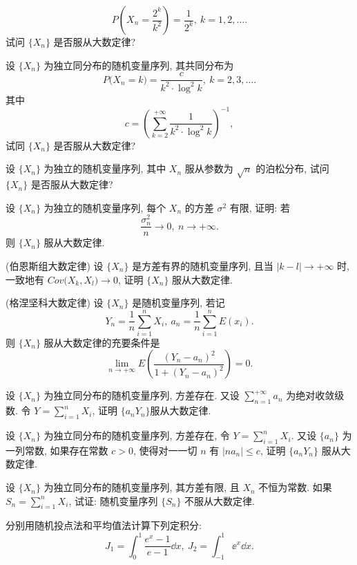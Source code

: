\begin{xiti}
\begin{equation*}
        P \left( X_n = \frac{2^k}{k^2} \right) = \frac{1}{2^k}, \ k = 1, 2, \dotsc .
    \end{equation*}
    试问 $ \{ X_n \} $ 是否服从大数定律?
    \item 设 $ \{ X_n \} $ 为独立同分布的随机变量序列, 其共同分布为
    \begin{equation*}
        P \bigl( X_n = k \bigr) = \frac{c}{k^2 \cdot \log^2 k}, \ k = 2, 3, \dotsc .
    \end{equation*}
    其中
    \begin{equation*}
        c = \left( \sum_{k = 2}^{+\infty} \frac{1}{k^2 \cdot \log^2 k} \right)^{-1},
    \end{equation*}
    试同 $ \{ X_n \} $ 是否服从大数定律?
    \item 设 $ \{ X_n \} $ 为独立的随机变量序列, 其中 $ X_n $ 服从参数为 $ \sqrt{n} $ 的泊松分布, 试问 $ \{ X_n \} $ 是否服从大数定律?
    \item 设 $ \{ X_n \} $ 为独立的随机变量序列, 每个 $ X_n $ 的方差 $ \sigma^2 $ 有限, 证明: 若
    \begin{equation*}
        \frac{\sigma_n^2}{n} \to 0, \ n \to +\infty.
    \end{equation*}
    则 $ \{ X_n \} $ 服从大数定律.
    \item (伯恩斯组大数定律) 设 $ \{ X_n \} $ 是方差有界的随机变量序列, 且当 $ \lvert k - l \rvert \to +\infty $ 时, 一致地有 $ Cov \bigl( X_k, X_l \bigr) \to 0 $, 证明 $ \{ X_n \} $ 服从大数定律.
    \item (格涅坚科大数定律) 设 $ \{ X_n \} $ 是随机变量序列, 若记
    \begin{equation*}
        Y_n = \frac{1}{n} \sum_{i=1}^n X_i, \ a_n = \frac{1}{n} \sum_{i=1}^n E (x_i).
    \end{equation*}
    则 $ \{ X_n \} $ 服从大数定律的充要条件是
    \begin{equation*}
        \lim_{n \to +\infty} E \left( \frac{( Y_n - a_n )^2}{1 + ( Y_n - a_n )^2} \right) = 0.
    \end{equation*}
    \item 设 $ \{ X_n \} $ 为独立同分布的随机变量序列, 方差存在.
    又设 $ \sum_{n=1}^{+\infty} a_n $ 为绝对收敛级数.
    令 $ Y = \sum_{i=1}^n X_i $, 证明 $ \{ a_n Y_n \} $服从大数定律.
    \item 设 $ \{ X_n \} $ 为独立同分布的随机变量序列, 方差存在, 令 $ Y = \sum_{i=1}^n X_i $. 又设 $ \{ a_n \} $ 为一列常数, 如果存在常数 $ c > 0 $, 使得对一一切 $ n $ 有 $ \lvert n a_n \rvert \leq c $, 证明 $ \{ a_n Y_n \} $ 服从大数定律.
    \item 设 $ \{ X_n \} $ 为独立同分布的随机变量序列, 其方差有限, 且 $ X_n $ 不恒为常数.
    如果 $ S_n = \sum_{i=1}^n X_i $, 试证: 随机变量序列 $ \{ S_n \} $ 不服从大数定律.
    \item 分别用随机投点法和平均值法计算下列定积分:
    \begin{equation*}
        J_1 = \int_0^1 \frac{e^x - 1}{e - 1} \dd x, \ J_2 = \int_{-1}^1 \ee^x \dd x.
    \end{equation*}
\end{xiti}

